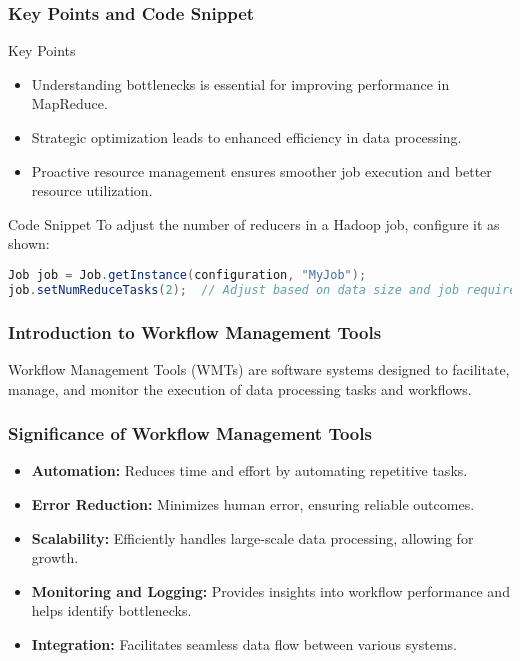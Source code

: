 \documentclass[aspectratio=169]{beamer}
\begin{document}
\begin{frame}[fragile]
    \frametitle{Key Points and Code Snippet}
    \begin{block}{Key Points}
        \begin{itemize}
            \item Understanding bottlenecks is essential for improving performance in MapReduce.
            \item Strategic optimization leads to enhanced efficiency in data processing.
            \item Proactive resource management ensures smoother job execution and better resource utilization.
        \end{itemize}
    \end{block}
    
    \begin{block}{Code Snippet}
    To adjust the number of reducers in a Hadoop job, configure it as shown:
    \begin{lstlisting}[language=Java]
Job job = Job.getInstance(configuration, "MyJob");
job.setNumReduceTasks(2);  // Adjust based on data size and job requirements
    \end{lstlisting}
    \end{block}
\end{frame}

\begin{frame}[fragile]
    \frametitle{Introduction to Workflow Management Tools}
    Workflow Management Tools (WMTs) are software systems designed to facilitate, manage, and monitor the execution of data processing tasks and workflows.
\end{frame}

\begin{frame}[fragile]
    \frametitle{Significance of Workflow Management Tools}
    \begin{itemize}
        \item \textbf{Automation:} Reduces time and effort by automating repetitive tasks.
        \item \textbf{Error Reduction:} Minimizes human error, ensuring reliable outcomes.
        \item \textbf{Scalability:} Efficiently handles large-scale data processing, allowing for growth.
        \item \textbf{Monitoring and Logging:} Provides insights into workflow performance and helps identify bottlenecks.
        \item \textbf{Integration:} Facilitates seamless data flow between various systems.
    \end{itemize}
\end{frame}
\end{document}
